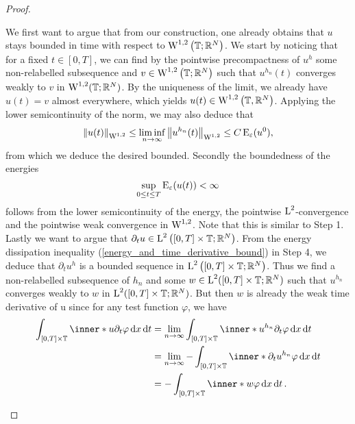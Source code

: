 \begin{proof}
\begin{description}[wide=0pt]
		We first want to argue that from our construction, one already obtains 
		that $ u $ stays bounded in time with respect to $ \operatorname{W}^{ 1 , 2 } 
		\left( \operatorname{\mathbb{T}} ; \mathbb{ R }^{ N } \right) $.
		We start by noticing that for a fixed $ t \in [ 0 , T ] $, we can find 
		by the pointwise precompactness of $ u^{ h } $ some
		non-relabelled subsequence and $ v \in \operatorname{W}^{ 1 , 2 } \left( \operatorname{\mathbb{T}} 
		; 
		\mathbb{ R }^{ N } \right) $ such that $ u^{ h_{ n } } ( t ) $ 
		converges 
		weakly to $ v $ in $ \operatorname{W}^{ 1 , 2 } ( \operatorname{\mathbb{T}} ; \mathbb{ R }^{ N } ) 
		$. By the uniqueness of the limit, we already have $ u ( t ) = v $ 
		almost 
		everywhere, which yields $ u ( t ) \in \operatorname{W}^{ 1 , 2 } \left( 
		\operatorname{\mathbb{T}}, 
		\mathbb{ R }^{ N } \right) $. Applying the lower semicontinuity of the 
		norm, 
		we may also deduce 
		that
		\begin{equation*}
			\norm{ u ( t ) }_{ \operatorname{W}^{ 1 , 2 } }
			\leq
			\liminf_{ n \to \infty }
			\norm{ u^{ h_{ n } } ( t ) }_{ \operatorname{W}^{ 1 , 2 } }
			\leq
			C \operatorname{E}_{ \varepsilon } ( u^{ 0 } ),
		\end{equation*}
		from which we deduce the desired bounded.	
		Secondly the boundedness of the energies
		\begin{equation*}
			\sup_{ 0 \leq t \leq T }
			\operatorname{E}_{ \varepsilon } ( u ( t ) ) 
			< \infty
		\end{equation*}
		follows from the lower semicontinuity of the energy, the pointwise $ 
		\operatorname{L}^{ 2 } $-convergence and the pointwise weak convergence in $ \operatorname{W}^{ 
		1 , 
		2 } $. Note that this is similar to Step 1.
		Lastly we want to argue that $ \partial_{ t } u \in \operatorname{L}^{2 } \left( [ 0 
		, T ] \times \operatorname{\mathbb{T}} ; \mathbb{ R }^{ N } \right) $. 
		From the energy dissipation inequality 
		(\ref{energy_and_time_derivative_bound}) in Step 4, we deduce that $ 
		\partial_{ t } u^{ h } $ is a bounded sequence in $ \operatorname{L}^{ 2 } \left( [ 
		0 , T ] 
		\times \operatorname{\mathbb{T}}; \mathbb{ R }^{ N } \right) $. Thus we find a 
		non-relabelled subsequence of $ h_{ n } $ and some $ w \in \operatorname{L}^{ 2 } ( 
		[ 0 , T ] \times \operatorname{\mathbb{T}} ; \mathbb{ R }^{ N } ) $ such that $ u^{ 
		h_{n } } $ converges weakly to $ w $ in $ \operatorname{L}^{ 2 } ( [0, T ] \times 
		\operatorname{\mathbb{T}} ; \mathbb{ R }^{ N } ) $. But then $ w $ is already the weak 
		time derivative of u since for any test function $ \varphi $, we have
		\begin{align*}
			\int_{ [ 0 , T ] \times \flattorus }
			\inner*{ u }{ \partial_{ t } \varphi }
			\dd{ x } \dd{ t }
			& =
			\lim_{ n \to \infty }
			\int_{ [ 0 , T ] \times \flattorus }
			\inner*{ u^{ h_{ n } } }{ \partial_{ t } \varphi }
			\dd{ x } \dd{ t }
			\\
			& =
			\lim_{n \to \infty }
			- \int_{ [ 0 , T ] \times \flattorus }
			\inner*{ \partial_{ t } u^{ h_{ n } } }{ \varphi }
			\dd{ x }\dd{ t }
			\\
			& =
			- \int_{ [ 0 , T ] \times \flattorus }
			\inner*{ w }{ \varphi }
			\dd{ x } \dd{ t }.
		\end{align*}
		

\end{description}
\end{proof}
